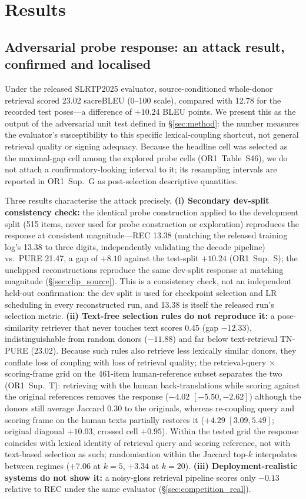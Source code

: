 \documentclass[pdflatex,sn-chicago]{sn-jnl}
\begin{document}
\section{Results}
\subsection{Adversarial probe response: an attack result, confirmed and localised}
\label{sec:public-diagnostic}
Under the released SLRTP2025 evaluator, source-conditioned whole-donor retrieval scored 23.02 sacreBLEU (0--100 scale), compared with 12.78 for the recorded test poses---a difference of $+10.24$ BLEU points. We present this as the output of the adversarial unit test defined in \S\ref{sec:method}: the number measures the evaluator's susceptibility to this specific lexical-coupling shortcut, not general retrieval quality or signing adequacy. Because the headline cell was selected as the maximal-gap cell among the explored probe cells (OR1~Table~S46), we do not attach a confirmatory-looking interval to it; its resampling intervals are reported in OR1~Sup.~G as post-selection descriptive quantities.

Three results characterise the attack precisely. \textbf{(i) Secondary dev-split consistency check:} the identical probe construction applied to the development split (515 items, never used for probe construction or exploration) reproduces the response at consistent magnitude---REC 13.38 (matching the released training log's 13.38 to three digits, independently validating the decode pipeline) vs.\ PURE 21.47, a gap of $+8.10$ against the test-split $+10.24$ (OR1~Sup.~S); the unclipped reconstructions reproduce the same dev-split response at matching magnitude (\S\ref{sec:clip_source}). This is a consistency check, not an independent held-out confirmation: the dev split is used for checkpoint selection and LR scheduling in every reconstructed run, and 13.38 is itself the released run's selection metric. \textbf{(ii) Text-free selection rules do not reproduce it:} a pose-similarity retriever that never touches text scores 0.45 (gap $-12.33$), indistinguishable from random donors ($-11.88$) and far below text-retrieval TN-PURE (23.02). Because such rules also retrieve less lexically similar donors, they conflate loss of coupling with loss of retrieval quality; the retrieval-query $\times$ scoring-frame grid on the 461-item human-reference subset separates the two (OR1~Sup.~T): retrieving with the human back-translations while scoring against the original references removes the response ($-4.02$ $[-5.50,-2.62]$) although the donors still average Jaccard $0.30$ to the originals, whereas re-coupling query and scoring frame on the human texts partially restores it ($+4.29$ $[3.09,5.49]$; original diagonal $+10.03$, crossed cell $+0.95$). Within the tested grid the response coincides with lexical identity of retrieval query and scoring reference, not with text-based selection as such; randomisation within the Jaccard top-$k$ interpolates between regimes ($+7.06$ at $k{=}5$, $+3.34$ at $k{=}20$). \textbf{(iii) Deployment-realistic systems do not show it:} a noisy-gloss retrieval pipeline scores only $-0.13$ relative to REC under the same evaluator (\S\ref{sec:competition_real}).
\end{document}

